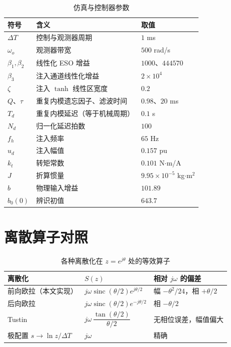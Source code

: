 \documentclass[11pt,a4paper]{ctexart}
\begin{document}
\begin{table}[h]
\centering
\caption{仿真与控制器参数}
\begin{tabular}{lll}
\toprule
符号 & 含义 & 取值 \\
\midrule
$\Delta T$ & 控制与观测器周期 & $1$ ms \\
$\omega_o$ & 观测器带宽 & $500$ rad/s \\
$\beta_1,\beta_2$ & 线性化 ESO 增益 & $1000$、$444570$ \\
$\beta_3$ & 注入通道线性化增益 & $2\times10^{4}$ \\
$\zeta$ & 注入 $\tanh$ 线性区宽度 & $0.2$ \\
$Q$、$\tau$ & 重复内模遗忘因子、滤波时间 & $0.98$、$20$ ms \\
$T_d$ & 重复内模延迟（等于机械周期） & $0.1$ s \\
$N_d$ & 归一化延迟拍数 & $100$ \\
$f_h$ & 注入频率 & $65$ Hz \\
$u_d$ & 注入幅值 & $0.157$ pu \\
$k_t$ & 转矩常数 & $0.101$ N$\cdot$m/A \\
$J$ & 折算惯量 & $9.95\times10^{-5}$ kg$\cdot$m$^2$ \\
$b$ & 物理输入增益 & $101.89$ \\
$b_0(0)$ & 辨识初值 & $643.7$ \\
\bottomrule
\end{tabular}
\end{table}

\section{离散算子对照}

\begin{table}[h]
\centering
\caption{各种离散化在 $z=e^{j\theta}$ 处的等效算子}
\begin{tabular}{lll}
\toprule
离散化 & $S(z)$ & 相对 $j\omega$ 的偏差 \\
\midrule
前向欧拉（本文实现） & $j\omega\operatorname{sinc}(\theta/2)e^{j\theta/2}$ & 幅 $-\theta^2/24$，相 $+\theta/2$ \\
后向欧拉 & $j\omega\operatorname{sinc}(\theta/2)e^{-j\theta/2}$ & 相 $-\theta/2$ \\
Tustin & $j\omega\,\dfrac{\tan(\theta/2)}{\theta/2}$ & 无相位误差，幅值偏大 \\
极配置 $s\to\ln z/\Delta T$ & $j\omega$ & 精确 \\
\bottomrule
\end{tabular}
\end{table}
\end{document}
